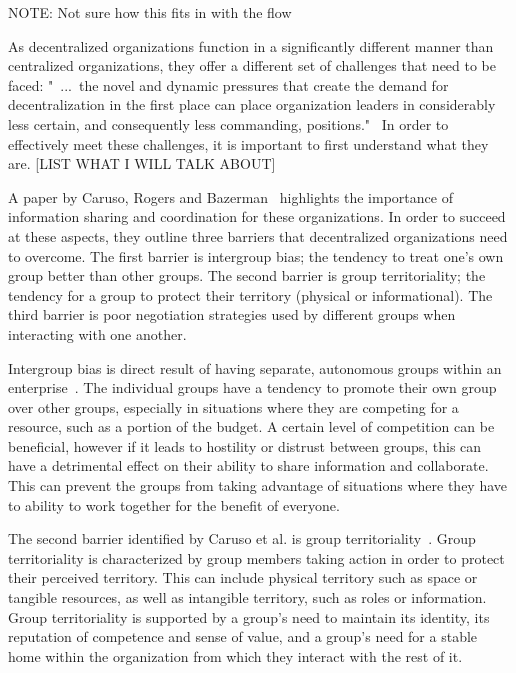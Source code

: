 NOTE: Not sure how this fits in with the flow

As decentralized organizations function in a significantly different manner than centralized organizations, they offer a different set of challenges that need to be faced: "~...~the novel and dynamic pressures that create the demand for decentralization in the first place can place organization leaders in considerably less certain, and consequently less commanding, positions."~\cite{caruso2008boundaries} In order to effectively meet these challenges, it is important to first understand what they are. [LIST WHAT I WILL TALK ABOUT]

A paper by Caruso, Rogers and Bazerman~\cite{caruso2008boundaries} highlights the importance of information sharing and coordination for these organizations. In order to succeed at these aspects, they outline three barriers that decentralized organizations need to overcome. The first barrier is intergroup bias; the tendency to treat one's own group better than other groups. The second barrier is group territoriality; the tendency for a group to protect their territory (physical or informational). The third barrier is poor negotiation strategies used by different groups when interacting with one another. 

Intergroup bias is direct result of having separate, autonomous groups within an enterprise~\cite{caruso2008boundaries}. The individual groups have a tendency to promote their own group over other groups, especially in situations where they are competing for a resource, such as a portion of the budget. A certain level of competition can be beneficial, however if it leads to hostility or distrust between groups, this can have a detrimental effect on their ability to share information and collaborate. This can prevent the groups from taking advantage of situations where they have to ability to work together for the benefit of everyone. 

The second barrier identified by Caruso et al. is group territoriality~\cite{caruso2008boundaries}. Group territoriality is characterized by group members taking action in order to protect their perceived territory. This can include physical territory such as space or tangible resources, as well as intangible territory, such as roles or information. Group territoriality is supported by a group's need to maintain its identity, its reputation of competence and sense of value, and a group's need for a stable home within the organization from which they interact with the rest of it.

